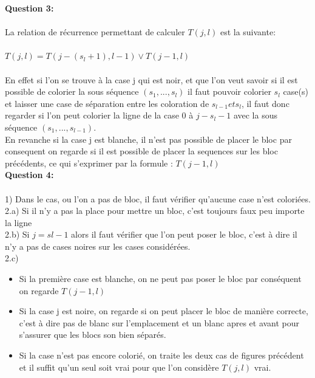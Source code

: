 \documentclass[a4paper]{memoir}
\begin{document}
 	\textbf{Question 3:}\\\\
 	La relation de récurrence permettant de calculer $T(j,l)$ est la suivante:\\\\
 	$T(j, l) = T(j-(s_{l}+1),l-1) \vee T(j-1,l)$\\\\
 	En effet si l'on se trouve à la case j qui est noir, et que l'on veut savoir si il est possible de colorier la sous séquence $(s_{1}, ..., s_{l})$ il faut pouvoir colorier $s_{l}$ case(s) et laisser une case de séparation entre les coloration de $s_{l-1} et s_{l}$, il faut donc regarder si l'on peut colorier la ligne de la case 0 à $j - s_{l} - 1$ avec la sous séquence $(s_{1}, ..., s_{l-1})$. \\
        En revanche si la case j est blanche, il n'est pas possible de placer le bloc par consequent on regarde si il est possible de placer la sequences sur les bloc précédents, ce qui s'exprimer par la formule : $T(j-1,l)$ \\


        \textbf{Question 4:}\\\\
        1) Dans le cas, ou l'on a pas de bloc, il faut vérifier qu'aucune case n'est coloriées.\\
        2.a) Si il n'y a pas la place pour mettre un bloc, c'est toujours faux peu importe la ligne \\
        2.b) Si $j = sl-1$ alors il faut vérifier que l'on peut poser le bloc, c'est à dire il n'y a pas de cases noires sur les cases considérées. \\
        2.c) \begin{itemize}
        \item Si la première case est blanche, on ne peut pas poser le bloc par conséquent on regarde $T(j-1,l)$
        \item Si la case j est noire, on regarde si on peut placer le bloc de manière correcte, c'est à dire pas de blanc sur l'emplacement et un blanc apres et avant pour s'assurer que les blocs son bien séparés.
        \item Si la case n'est pas encore colorié, on traite les deux cas de figures précédent et il suffit qu'un seul soit vrai pour que l'on considère $T(j,l)$ vrai.
          \end{itemize}
        
        
\end{document}
